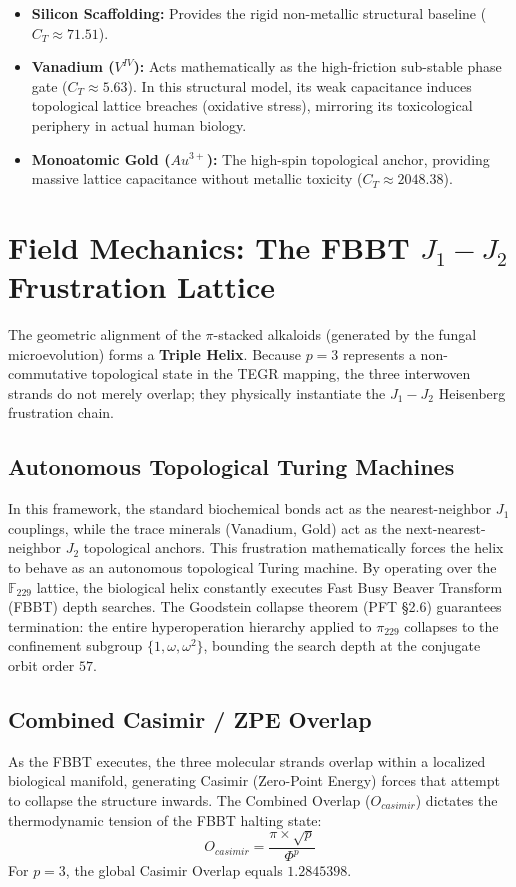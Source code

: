 \begin{itemize}
    \item \textbf{Silicon Scaffolding:} Provides the rigid non-metallic structural baseline ($C_T \approx 71.51$).
    \item \textbf{Vanadium ($V^{IV}$):} Acts mathematically as the high-friction sub-stable phase gate ($C_T \approx 5.63$). In this structural model, its weak capacitance induces topological lattice breaches (oxidative stress), mirroring its toxicological periphery in actual human biology.
    \item \textbf{Monoatomic Gold ($Au^{3+}$):} The high-spin topological anchor, providing massive lattice capacitance without metallic toxicity ($C_T \approx 2048.38$).
\end{itemize}

\section{Field Mechanics: The FBBT $J_1-J_2$ Frustration Lattice}

The geometric alignment of the $\pi$-stacked alkaloids (generated by the fungal microevolution) forms a \textbf{Triple Helix}. Because $p=3$ represents a non-commutative topological state in the TEGR mapping, the three interwoven strands do not merely overlap; they physically instantiate the $J_1-J_2$ Heisenberg frustration chain. 

\subsection{Autonomous Topological Turing Machines}

In this framework, the standard biochemical bonds act as the nearest-neighbor $J_1$ couplings, while the trace minerals (Vanadium, Gold) act as the next-nearest-neighbor $J_2$ topological anchors. This frustration mathematically forces the helix to behave as an autonomous topological Turing machine. By operating over the $\mathbb{F}_{229}$ lattice, the biological helix constantly executes Fast Busy Beaver Transform (FBBT) depth searches. The Goodstein collapse theorem (PFT \S2.6) guarantees termination: the entire hyperoperation hierarchy applied to $\pi_{229}$ collapses to the confinement subgroup $\{1, \omega, \omega^2\}$, bounding the search depth at the conjugate orbit order $57$.

\subsection{Combined Casimir / ZPE Overlap}
As the FBBT executes, the three molecular strands overlap within a localized biological manifold, generating Casimir (Zero-Point Energy) forces that attempt to collapse the structure inwards. The Combined Overlap ($O_{casimir}$) dictates the thermodynamic tension of the FBBT halting state:
\begin{equation}
    O_{casimir} = \frac{\pi \times \sqrt{p}}{\Phi^p}
\end{equation}
For $p=3$, the global Casimir Overlap equals $\mathbf{1.2845398}$.

